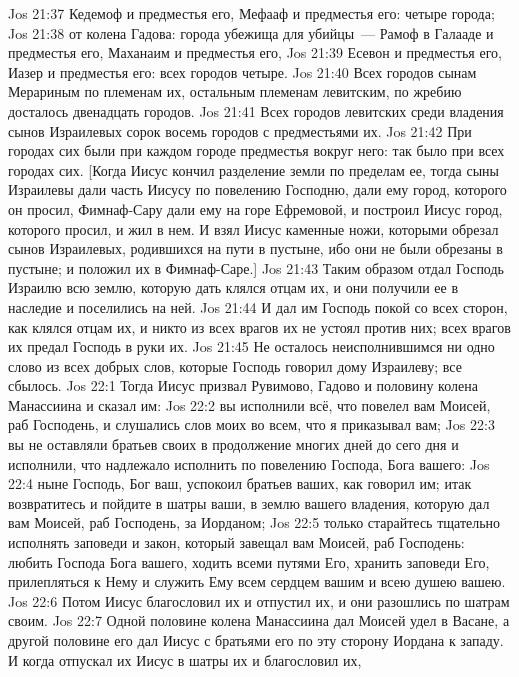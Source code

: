 \vs Jos 21:37 Кедемоф и предместья его, Мефааф и предместья его: четыре города;
\vs Jos 21:38 от колена Гадова: города убежища для убийцы~--- Рамоф в Галааде и предместья его, Маханаим и предместья его,
\vs Jos 21:39 Есевон и предместья его, Иазер и предместья его: всех городов четыре.
\vs Jos 21:40 Всех городов сынам Мерариным по племенам их, остальным племенам левитским, по жребию досталось двенадцать городов.
\rsbpar\vs Jos 21:41 Всех городов левитских среди владения сынов Израилевых  сорок восемь городов с предместьями их.
\vs Jos 21:42 При городах сих были при каждом городе предместья вокруг него: так было при всех городах сих. [Когда Иисус кончил разделение земли по пределам ее, тогда сыны Израилевы дали часть Иисусу по повелению Господню, дали ему город, которого он просил, Фимнаф-Сару дали ему на горе Ефремовой, и построил Иисус город, которого просил, и жил в нем. И взял Иисус каменные ножи, которыми обрезал сынов Израилевых, родившихся на пути в пустыне, ибо они не были обрезаны в пустыне; и положил их в Фимнаф-Саре.]
\vs Jos 21:43 Таким образом отдал Господь Израилю всю землю, которую дать клялся отцам их, и они получили ее в наследие и поселились на ней.
\vs Jos 21:44 И дал им Господь покой со всех сторон, как клялся отцам их, и никто из всех врагов их не устоял против них; всех врагов их предал Господь в руки их.
\vs Jos 21:45 Не осталось неисполнившимся ни одно слово из всех добрых слов, которые Господь говорил дому Израилеву; все сбылось.
\vs Jos 22:1 Тогда Иисус призвал  Рувимово, Гадово и половину колена Манассиина и сказал им:
\vs Jos 22:2 вы исполнили всё, что повелел вам Моисей, раб Господень, и слушались слов моих во всем, что я приказывал вам;
\vs Jos 22:3 вы не оставляли братьев своих в продолжение многих дней до сего дня и исполнили, что надлежало исполнить по повелению Господа, Бога вашего:
\vs Jos 22:4 ныне Господь, Бог ваш, успокоил братьев ваших, как говорил им; итак возвратитесь и пойдите в шатры ваши, в землю вашего владения, которую дал вам Моисей, раб Господень, за Иорданом;
\vs Jos 22:5 только старайтесь тщательно исполнять заповеди и закон, который завещал вам Моисей, раб Господень: любить Господа Бога вашего, ходить всеми путями Его, хранить заповеди Его, прилепляться к Нему и служить Ему всем сердцем вашим и всею душею вашею.
\vs Jos 22:6 Потом Иисус благословил их и отпустил их, и они разошлись по шатрам своим.
\vs Jos 22:7 Одной половине колена Манассиина дал Моисей удел в Васане, а другой половине его дал Иисус  с братьями его по эту сторону Иордана к западу. И когда отпускал их Иисус в шатры их и благословил их,
